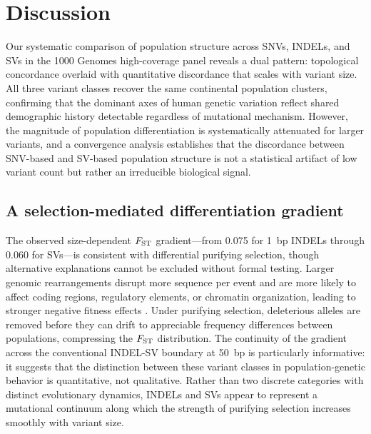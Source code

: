 \section*{Discussion}

Our systematic comparison of population structure across SNVs, INDELs, and SVs in the 1000 Genomes high-coverage panel reveals a dual pattern: topological concordance overlaid with quantitative discordance that scales with variant size. All three variant classes recover the same continental population clusters, confirming that the dominant axes of human genetic variation reflect shared demographic history detectable regardless of mutational mechanism. However, the magnitude of population differentiation is systematically attenuated for larger variants, and a convergence analysis establishes that the discordance between SNV-based and SV-based population structure is not a statistical artifact of low variant count but rather an irreducible biological signal.

\subsection*{A selection-mediated differentiation gradient}

The observed size-dependent $F_\mathrm{ST}$ gradient---from 0.075 for 1~bp INDELs through 0.060 for SVs---is consistent with differential purifying selection, though alternative explanations cannot be excluded without formal testing. Larger genomic rearrangements disrupt more sequence per event and are more likely to affect coding regions, regulatory elements, or chromatin organization, leading to stronger negative fitness effects \citep{abel2020, sudmant2015}. Under purifying selection, deleterious alleles are removed before they can drift to appreciable frequency differences between populations, compressing the $F_\mathrm{ST}$ distribution. The continuity of the gradient across the conventional INDEL-SV boundary at 50~bp is particularly informative: it suggests that the distinction between these variant classes in population-genetic behavior is quantitative, not qualitative. Rather than two discrete categories with distinct evolutionary dynamics, INDELs and SVs appear to represent a mutational continuum along which the strength of purifying selection increases smoothly with variant size.


